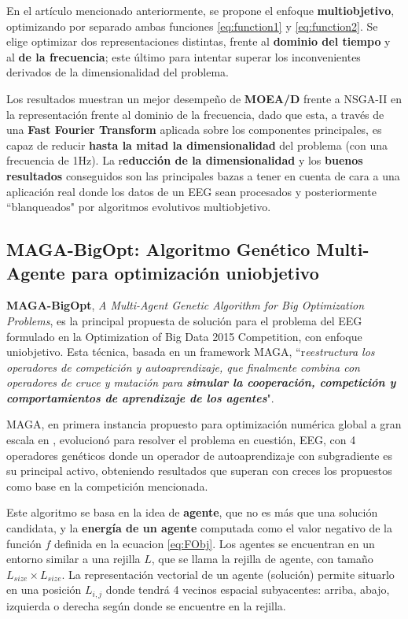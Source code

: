 En el artículo mencionado anteriormente, se propone el enfoque \textbf{multiobjetivo}, optimizando por separado ambas funciones \ref{eq:function1} y \ref{eq:function2}. Se elige optimizar dos representaciones distintas, frente al \textbf{dominio del tiempo} y al \textbf{de la frecuencia}; este último para intentar superar los inconvenientes derivados de la dimensionalidad del problema.

Los resultados muestran un mejor desempeño de \textbf{MOEA/D} frente a NSGA-II en la representación frente al dominio de la frecuencia, dado que esta, a través de una \textbf{Fast Fourier Transform} aplicada sobre los componentes principales, es capaz de reducir \textbf{hasta la mitad la dimensionalidad} del problema (con una frecuencia de 1Hz). La r\textbf{educción de la dimensionalidad} y los\textbf{ buenos resultados} conseguidos son las principales bazas a tener en cuenta de cara a una aplicación real donde los datos de un EEG sean procesados y posteriormente ``blanqueados" por algoritmos evolutivos multiobjetivo.

\subsection{MAGA-BigOpt: Algoritmo Genético Multi-Agente para optimización uniobjetivo}

\textbf{MAGA-BigOpt}, \textit{A Multi-Agent Genetic Algorithm for Big Optimization Problems}\cite{MAGA-BigOpt}, es la principal propuesta de solución para el problema del EEG formulado en la Optimization of Big Data 2015 Competition, con enfoque uniobjetivo. Esta técnica, basada en un framework MAGA, ``r\textit{eestructura los operadores de competición y autoaprendizaje, que finalmente combina con operadores de cruce y mutación para \textbf{simular la cooperación, competición y comportamientos de aprendizaje de los agentes}}".

MAGA, en primera instancia propuesto para optimización numérica global a gran escala en\cite{MAGA} , evolucionó para resolver el problema en cuestión, EEG, con 4 operadores genéticos donde un operador de autoaprendizaje con subgradiente es su principal activo, obteniendo resultados que superan con creces los propuestos como base en la competición mencionada.

Este algoritmo se basa en la idea de \textbf{agente}, que no es más que una solución candidata, y la \textbf{energía de un agente} computada como el valor negativo de la función $f$ definida en la ecuacion \ref{eq:FObj}. Los agentes se encuentran en un entorno similar a una rejilla $L$, que se llama la rejilla de agente, con tamaño $L_{size}\times L_{size}$. La representación vectorial de un agente (solución) permite situarlo en una posición $L_{i,j}$ donde tendrá 4 vecinos espacial subyacentes: arriba, abajo, izquierda o derecha según donde se encuentre en la rejilla. 

